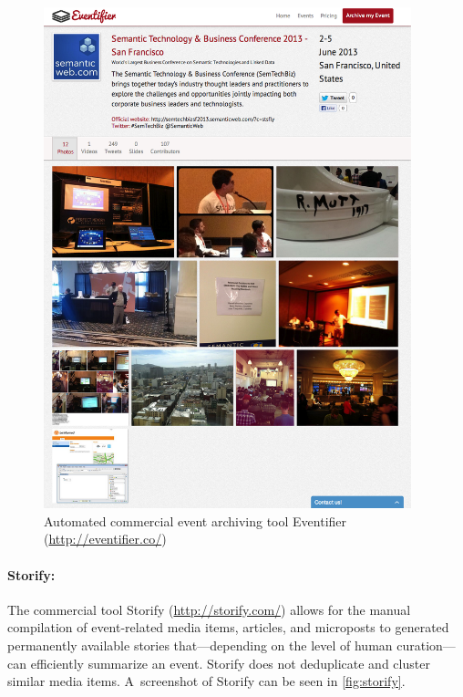 \begin{figure}
  \centering
  \includegraphics[width=0.95\textwidth,height=0.9\textheight,keepaspectratio]{eventifier.png}
  \caption[Automated commercial event archiving tool Eventifier]{Automated commercial event archiving tool Eventifier
    (\url{http://eventifier.co/})}
  \label{fig:eventifier}
\end{figure}

\paragraph{Storify:}

The commercial tool Storify (\url{http://storify.com/})
allows for the manual compilation of
event-related media items, articles, and microposts
to generated permanently available stories
that---depending on the level of human curation---%
can efficiently summarize an event.
Storify does not deduplicate and cluster
similar media items.
A~screenshot of Storify can be seen in \autoref{fig:storify}.

